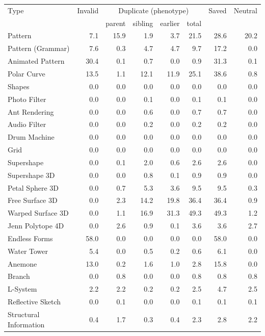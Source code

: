 \begin{tabular}{lrrrrrr|r}
\toprule
Type & Invalid & \multicolumn{4}{c}{Duplicate (phenotype)} & Saved & Neutral \\
     &         & parent & sibling & earlier & total &       &         \\
\midrule
Pattern & 7.1 & 15.9 & 1.9 & 3.7 & 21.5 & 28.6 & 20.2 \\
Pattern (Grammar) & 7.6 & 0.3 & 4.7 & 4.7 & 9.7 & 17.2 & 0.0 \\
Animated Pattern & 30.4 & 0.1 & 0.7 & 0.0 & 0.9 & 31.3 & 0.1 \\
Polar Curve & 13.5 & 1.1 & 12.1 & 11.9 & 25.1 & 38.6 & 0.8 \\
Shapes & 0.0 & 0.0 & 0.0 & 0.0 & 0.0 & 0.0 & 0.0 \\
Photo Filter & 0.0 & 0.0 & 0.1 & 0.0 & 0.1 & 0.1 & 0.0 \\
Ant Rendering & 0.0 & 0.0 & 0.6 & 0.0 & 0.7 & 0.7 & 0.0 \\
Audio Filter & 0.0 & 0.0 & 0.2 & 0.0 & 0.2 & 0.2 & 0.0 \\
Drum Machine & 0.0 & 0.0 & 0.0 & 0.0 & 0.0 & 0.0 & 0.0 \\
Grid & 0.0 & 0.0 & 0.0 & 0.0 & 0.0 & 0.0 & 0.0 \\
Supershape & 0.0 & 0.1 & 2.0 & 0.6 & 2.6 & 2.6 & 0.0 \\
Supershape 3D & 0.0 & 0.0 & 0.8 & 0.1 & 0.9 & 0.9 & 0.0 \\
Petal Sphere 3D & 0.0 & 0.7 & 5.3 & 3.6 & 9.5 & 9.5 & 0.3 \\
Free Surface 3D & 0.0 & 2.3 & 14.2 & 19.8 & 36.4 & 36.4 & 0.9 \\
Warped Surface 3D & 0.0 & 1.1 & 16.9 & 31.3 & 49.3 & 49.3 & 1.2 \\
Jenn Polytope 4D & 0.0 & 2.6 & 0.9 & 0.1 & 3.6 & 3.6 & 2.7 \\
Endless Forms & 58.0 & 0.0 & 0.0 & 0.0 & 0.0 & 58.0 & 0.0 \\
Water Tower & 5.4 & 0.0 & 0.5 & 0.2 & 0.6 & 6.1 & 0.0 \\
Anemone & 13.0 & 0.2 & 1.6 & 1.0 & 2.8 & 15.8 & 0.0 \\
Branch & 0.0 & 0.8 & 0.0 & 0.0 & 0.8 & 0.8 & 0.8 \\
L-System & 2.2 & 2.2 & 0.2 & 0.2 & 2.5 & 4.7 & 2.5 \\
Reflective Sketch & 0.0 & 0.1 & 0.0 & 0.0 & 0.1 & 0.1 & 0.1 \\
Structural Information & 0.4 & 1.7 & 0.3 & 0.4 & 2.3 & 2.8 & 2.2 \\

\end{tabular}
